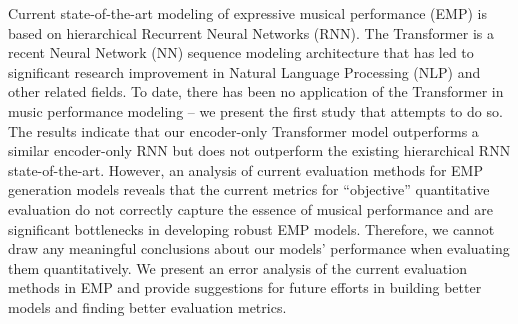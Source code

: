 Current state-of-the-art modeling of expressive musical performance (EMP) is based on hierarchical Recurrent Neural Networks (RNN). The Transformer is a recent Neural Network (NN) sequence modeling architecture that has led to significant research improvement in Natural Language Processing (NLP) and other related fields. To date, there has been no application of the Transformer in music performance modeling -- we present the first study that attempts to do so. The results indicate that our encoder-only Transformer model outperforms a similar encoder-only RNN but does not outperform the existing hierarchical RNN state-of-the-art. However, an analysis of current evaluation methods for EMP generation models reveals that the current metrics for ``objective'' quantitative evaluation do not correctly capture the essence of musical performance and are significant bottlenecks in developing robust EMP models. Therefore, we cannot draw any meaningful conclusions about our models' performance when evaluating them quantitatively. We present an error analysis of the current evaluation methods in EMP and provide suggestions for future efforts in building better models and finding better evaluation metrics.
